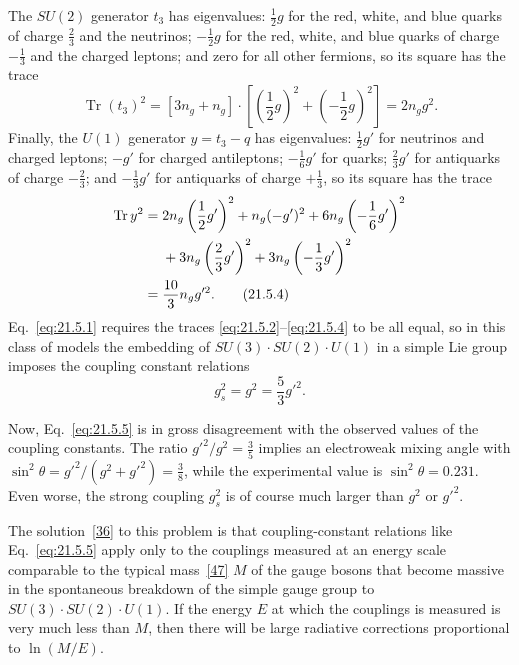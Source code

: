 The $SU(2)$ generator $t_3$ has eigenvalues: $\frac{1}{2}g$ for the red, white, and blue quarks of charge $\frac{2}{3}$ and the neutrinos; $-\frac{1}{2}g$ for the red, white, and blue quarks of charge $-\frac{1}{3}$ and the charged leptons; and zero for all other fermions, so its square has the trace
\begin{equation}
\operatorname{Tr}(t_3)^2
=[3n_g+n_g]\cdot\left[
\left(\frac{1}{2}g\right)^2
+\left(-\frac{1}{2}g\right)^2
\right]
=2n_gg^2.
\tag{21.5.3}\label{eq:21.5.3}
\end{equation}
Finally, the $U(1)$ generator $y=t_3-q$ has eigenvalues: $\frac{1}{2}g'$ for neutrinos and charged leptons; $-g'$ for charged antileptons; $-\frac{1}{6}g'$ for quarks; $\frac{2}{3}g'$ for antiquarks of charge $-\frac{2}{3}$; and $-\frac{1}{3}g'$ for antiquarks of charge $+\frac{1}{3}$, so its square has the trace
\begin{align}
\operatorname{Tr}y^2
={}&2n_g\left(\frac{1}{2}g'\right)^2
+n_g(-g')^2
+6n_g\left(-\frac{1}{6}g'\right)^2
\notag\\
&+3n_g\left(\frac{2}{3}g'\right)^2
+3n_g\left(-\frac{1}{3}g'\right)^2
\notag\\
={}&\frac{10}{3}n_gg'^2.
\tag{21.5.4}\label{eq:21.5.4}
\end{align}
Eq.~\eqref{eq:21.5.1} requires the traces \eqref{eq:21.5.2}--\eqref{eq:21.5.4} to be all equal, so in this class of models the embedding of $SU(3)\cdot SU(2)\cdot U(1)$ in a simple Lie group imposes the coupling constant relations
\begin{equation}
g_s^2=g^2=\frac{5}{3}g'^2.
\tag{21.5.5}\label{eq:21.5.5}
\end{equation}

Now, Eq.~\eqref{eq:21.5.5} is in gross disagreement with the observed values of the coupling constants. The ratio $g'^2/g^2=\frac{3}{5}$ implies an electroweak mixing angle with $\sin^2\theta=g'^2/(g^2+g'^2)=\frac{3}{8}$, while the experimental value is $\sin^2\theta=0.231$. Even worse, the strong coupling $g_s^2$ is of course much larger than $g^2$ or $g'^2$.

The solution~\hyperref[ch21-ref-36]{[36]} to this problem is that coupling-constant relations like Eq.~\eqref{eq:21.5.5} apply only to the couplings measured at an energy scale comparable to the typical mass~\hyperref[ch21-ref-47]{[47]} $M$ of the gauge bosons that become massive in the spontaneous breakdown of the simple gauge group to $SU(3)\cdot SU(2)\cdot U(1)$. If the energy $E$ at which the couplings is measured is very much less than $M$, then there will be large radiative corrections proportional to $\ln(M/E)$.

